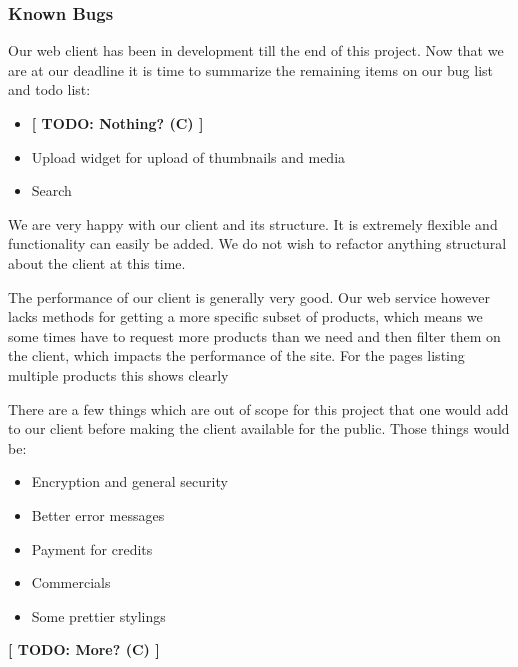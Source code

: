 \subsubsection{Known Bugs}
Our web client has been in development till the end of this project. Now that we are at our deadline it is time to summarize the remaining items on our bug list and todo list:

\begin{itemize}
\item \textbf{[ TODO: Nothing? (C) ]}
\end{itemize}

\begin{itemize}
\item Upload widget for upload of thumbnails and media
\item Search
\end{itemize}


We are very happy with our client and its structure. It is extremely flexible and functionality can easily be added. We do not wish to refactor anything structural about the client at this time.

The performance of our client is generally very good. Our web service however lacks methods for getting a more specific subset of products, which means we some times have to request more products than we need and then filter them on the client, which impacts the performance of the site. For the pages listing multiple products this shows clearly

There are a few things which are out of scope for this project that one would add to our client before making the client available for the public. Those things would be:
\begin{itemize}
\item Encryption and general security
\item Better error messages
\item Payment for credits
\item Commercials
\item Some prettier stylings
\end{itemize}
\textbf{[ TODO: More? (C) ]}